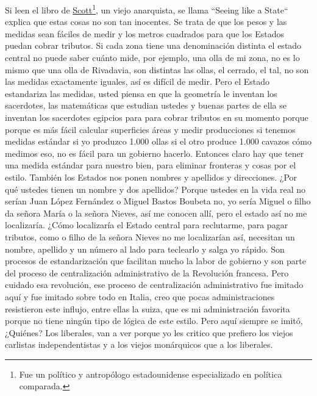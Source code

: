 Si leen el libro de \href{https://en.wikipedia.org/wiki/James_C._Scott}{Scott}\footnote{Fue un político y antropólogo estadounidense especializado en política comparada.}, un viejo anarquista, se llama ``Seeing like a State``\cite{scott1998seeing} explica que estas cosas no son tan inocentes. Se trata de que los pesos y las medidas sean fáciles de medir y los metros cuadrados para que los Estados puedan cobrar tributos. Si cada zona tiene una denominación distinta el estado central no puede saber cuánto mide, por ejemplo, una olla de mi zona, no es lo mismo que una olla de Rivadavia, son distintas las ollas, el cerrado, el tal, no son las medidas exactamente iguales, así es difícil de medir. Pero el Estado estandariza las medidas, usted piensa en que la geometría le inventan los sacerdotes, las matemáticas que estudian ustedes y buenas partes de ella se inventan los sacerdotes egipcios para para cobrar tributos en su momento porque porque es más fácil calcular superficies áreas y medir producciones si tenemos medidas estándar si yo produzco 1.000 ollas si el otro produce 1.000 cavazos cómo medimos eso, no es fácil para un gobierno hacerlo. Entonces claro hay que tener una medida estándar para nuestro bien, para eliminar fronteras y cosas por el estilo. También los Estados nos ponen nombres y apellidos y direcciones. ¿Por qué ustedes tienen un nombre y dos apellidos? Porque ustedes en la vida real no serían Juan López Fernández o Miguel Bastos Boubeta no, yo sería Miguel o filho da señora María o la señora Nieves, así me conocen allí, pero el estado así no me localizaría. ¿Cómo localizaría el Estado central para reclutarme, para pagar tributos, como o filho de la señora Nieves no me localizarían así, necesitan un nombre, apellido y un número al lado para teclearlo y salga yo rápido. Son procesos de estandarización que facilitan mucho la labor de gobierno y son parte del proceso de centralización administrativo de la Revolución francesa. Pero cuidado esa revolución, ese proceso de centralización administrativo fue imitado aquí y fue imitado sobre todo en Italia, creo que pocas administraciones resistieron este influjo, entre ellas la suiza, que es mi administración favorita porque no tiene ningún tipo de lógica de este estilo. Pero aquí siempre se imitó, ¿Quiénes? Los liberales, van a ver porque yo les critico que prefiero los viejos carlistas independentistas y a los viejos monárquicos que a los liberales.

